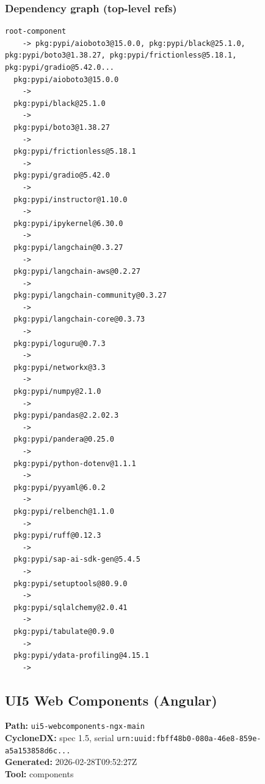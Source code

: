 \documentclass[11pt,a4paper]{article}
\begin{document}
\subsubsection*{Dependency graph (top-level refs)}
\begin{lstlisting}[style=depgraph]
  root-component
    -> pkg:pypi/aioboto3@15.0.0, pkg:pypi/black@25.1.0, pkg:pypi/boto3@1.38.27, pkg:pypi/frictionless@5.18.1, pkg:pypi/gradio@5.42.0...
  pkg:pypi/aioboto3@15.0.0
    -> 
  pkg:pypi/black@25.1.0
    -> 
  pkg:pypi/boto3@1.38.27
    -> 
  pkg:pypi/frictionless@5.18.1
    -> 
  pkg:pypi/gradio@5.42.0
    -> 
  pkg:pypi/instructor@1.10.0
    -> 
  pkg:pypi/ipykernel@6.30.0
    -> 
  pkg:pypi/langchain@0.3.27
    -> 
  pkg:pypi/langchain-aws@0.2.27
    -> 
  pkg:pypi/langchain-community@0.3.27
    -> 
  pkg:pypi/langchain-core@0.3.73
    -> 
  pkg:pypi/loguru@0.7.3
    -> 
  pkg:pypi/networkx@3.3
    -> 
  pkg:pypi/numpy@2.1.0
    -> 
  pkg:pypi/pandas@2.2.02.3
    -> 
  pkg:pypi/pandera@0.25.0
    -> 
  pkg:pypi/python-dotenv@1.1.1
    -> 
  pkg:pypi/pyyaml@6.0.2
    -> 
  pkg:pypi/relbench@1.1.0
    -> 
  pkg:pypi/ruff@0.12.3
    -> 
  pkg:pypi/sap-ai-sdk-gen@5.4.5
    -> 
  pkg:pypi/setuptools@80.9.0
    -> 
  pkg:pypi/sqlalchemy@2.0.41
    -> 
  pkg:pypi/tabulate@0.9.0
    -> 
  pkg:pypi/ydata-profiling@4.15.1
    -> 
\end{lstlisting}

\subsection{UI5 Web Components (Angular)}
\textbf{Path:} \texttt{ui5-webcomponents-ngx-main}
\\ \textbf{CycloneDX:} spec 1.5, serial \texttt{urn:uuid:fbff48b0-080a-46e8-859e-a5a153858d6c...}
\\ \textbf{Generated:} 2026-02-28T09:52:27Z
\\ \textbf{Tool:} components
\end{document}
